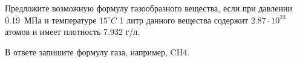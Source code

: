 
Предложите
возможную формулу газообразного вещества, если при
давлении 0.19~МПа и температуре $15^{\circ}C$ 1 литр данного вещества содержит $2.87 \cdot 10^{23}$ атомов 
и имеет плотность 7.932 г/л. 

В ответе запишите формулу газа, например, CH4.

